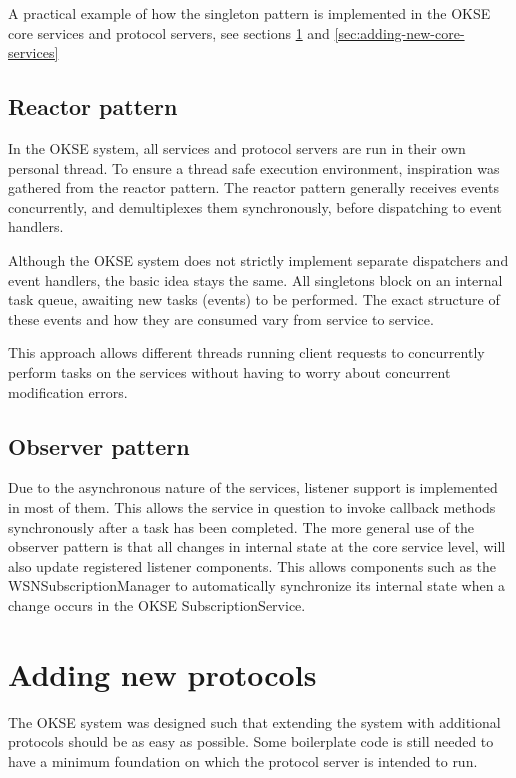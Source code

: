 A practical example of how the singleton pattern is implemented in the OKSE core services and protocol servers, see sections \ref{sec:adding-new-protocols} and \ref{sec:adding-new-core-services}

\subsection{Reactor pattern}

In the OKSE system, all services and protocol servers are run in their own personal thread. To ensure a thread safe execution environment, inspiration was gathered from the reactor pattern. The reactor pattern generally receives events concurrently, and demultiplexes them synchronously, before dispatching to event handlers.

Although the OKSE system does not strictly implement separate dispatchers and event handlers, the basic idea stays the same. All singletons block on an internal task queue, awaiting new tasks (events) to be performed. The exact structure of these events and how they are consumed vary from service to service.

This approach allows different threads running client requests to concurrently perform tasks on the services without having to worry about concurrent modification errors.

\subsection{Observer pattern}

Due to the asynchronous nature of the services, listener support is implemented in most of them. This allows the service in question to invoke callback methods synchronously after a task has been completed. The more general use of the observer pattern is that all changes in internal state at the core service level, will also update registered listener components. This allows components such as the WSNSubscriptionManager to automatically synchronize its internal state when a change occurs in the OKSE SubscriptionService.

\section{Adding new protocols}
\label{sec:adding-new-protocols}

The OKSE system was designed such that extending the system with additional protocols should be as easy as possible. Some boilerplate code is still needed to have a minimum foundation on which the protocol server is intended to run.

